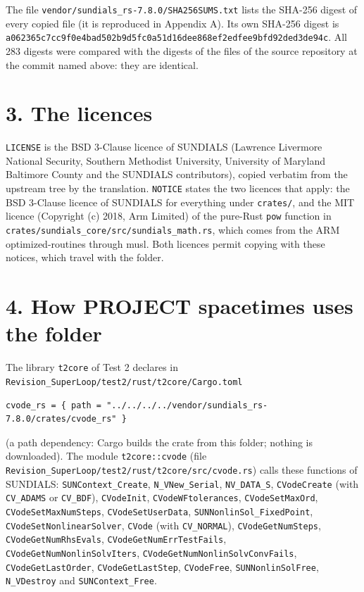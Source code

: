 \documentclass[
  10pt,
]{article}
\begin{document}
The file \texttt{vendor/sundials\_rs-7.8.0/SHA256SUMS.txt} lists the
SHA-256 digest of every copied file (it is reproduced in Appendix A).
Its own SHA-256 digest is
\texttt{a062365c7cc9f0e4bad502b9d5fc0a51d16dee868ef2edfee9bfd92ded3de94c}.
All 283 digests were compared with the digests of the files of the
source repository at the commit named above: they are identical.

\hypertarget{the-licences}{%
\section{3. The licences}\label{the-licences}}

\texttt{LICENSE} is the BSD 3-Clause licence of SUNDIALS (Lawrence
Livermore National Security, Southern Methodist University, University
of Maryland Baltimore County and the SUNDIALS contributors), copied
verbatim from the upstream tree by the translation. \texttt{NOTICE}
states the two licences that apply: the BSD 3-Clause licence of SUNDIALS
for everything under \texttt{crates/}, and the MIT licence (Copyright
(c) 2018, Arm Limited) of the pure-Rust \texttt{pow} function in
\texttt{crates/sundials\_core/src/sundials\_math.rs}, which comes from
the ARM optimized-routines through musl. Both licences permit copying
with these notices, which travel with the folder.

\hypertarget{how-project-spacetimes-uses-the-folder}{%
\section{4. How PROJECT spacetimes uses the
folder}\label{how-project-spacetimes-uses-the-folder}}

The library \texttt{t2core} of Test 2 declares in
\texttt{Revision\_SuperLoop/test2/rust/t2core/Cargo.toml}

\begin{verbatim}
cvode_rs = { path = "../../../../vendor/sundials_rs-7.8.0/crates/cvode_rs" }
\end{verbatim}

(a path dependency: Cargo builds the crate from this folder; nothing is
downloaded). The module \texttt{t2core::cvode} (file
\texttt{Revision\_SuperLoop/test2/rust/t2core/src/cvode.rs}) calls these
functions of SUNDIALS: \texttt{SUNContext\_Create},
\texttt{N\_VNew\_Serial}, \texttt{NV\_DATA\_S}, \texttt{CVodeCreate}
(with \texttt{CV\_ADAMS} or \texttt{CV\_BDF}), \texttt{CVodeInit},
\texttt{CVodeWFtolerances}, \texttt{CVodeSetMaxOrd},
\texttt{CVodeSetMaxNumSteps}, \texttt{CVodeSetUserData},
\texttt{SUNNonlinSol\_FixedPoint}, \texttt{CVodeSetNonlinearSolver},
\texttt{CVode} (with \texttt{CV\_NORMAL}), \texttt{CVodeGetNumSteps},
\texttt{CVodeGetNumRhsEvals}, \texttt{CVodeGetNumErrTestFails},
\texttt{CVodeGetNumNonlinSolvIters},
\texttt{CVodeGetNumNonlinSolvConvFails}, \texttt{CVodeGetLastOrder},
\texttt{CVodeGetLastStep}, \texttt{CVodeFree},
\texttt{SUNNonlinSolFree}, \texttt{N\_VDestroy} and
\texttt{SUNContext\_Free}.
\end{document}
